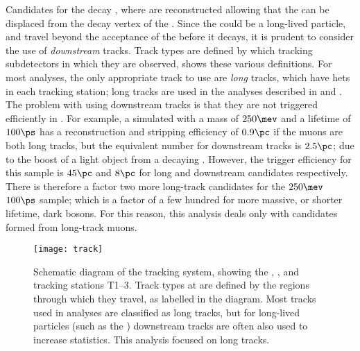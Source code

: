 Candidates for the decay \btokstrdb, where \dbtomumu are reconstructed allowing that the \db can
be displaced from the decay vertex of the \Bd.
Since the \db could be a long-lived particle, and travel beyond the acceptance of the \velo before
it decays, it is prudent to consider the use of \emph{downstream} tracks.
Track types are defined by which tracking subdetectors in which they are observed,
 shows these various definitions.
For most \lhcb analyses, the only appropriate track to use are \emph{long} tracks, which have hets
in each tracking station; long tracks are used in the analyses described in  and
.
The problem with using downstream tracks is that they are not triggered efficiently in \hlttwo.
For example, a simulated \db with a mass of $250\mev$ and a lifetime of $100\ps$ has a
reconstruction and
stripping efficiency of \approx$0.9\pc$ if the muons are both long tracks, but the equivalent
number for downstream tracks is \approx$2.5\pc$; due to the boost of a light object from a decaying
\Bd.
However, the trigger efficiency for this sample is \approx$45\pc$ and $8\pc$ for long and
downstream candidates respectively.
There is therefore a factor two more long-track candidates for the $250\mev$ $100\ps$ sample; which
is a factor of a few hundred for more massive, or shorter lifetime, dark bosons.
For this reason, this analysis deals only with \db candidates formed from long-track muons.

\begin{figure}
  \begin{center}
    \texttt{[image: track]}
    \caption[Track definitions in the LHCb detector]{
      Schematic diagram of the \lhcb tracking system, showing the \velo, \ttracker, and tracking
      stations T1--3.
      Track types at \lhcb are defined by the regions through which they travel, as labelled in the
      diagram.
      Most tracks used in analyses are classified as long tracks, but for long-lived particles
      (such as the \KS) downstream tracks are often also used to increase statistics.
      This analysis focused on long tracks.
    }
    \label{fig:db:lldd}
  \end{center}
\end{figure}



